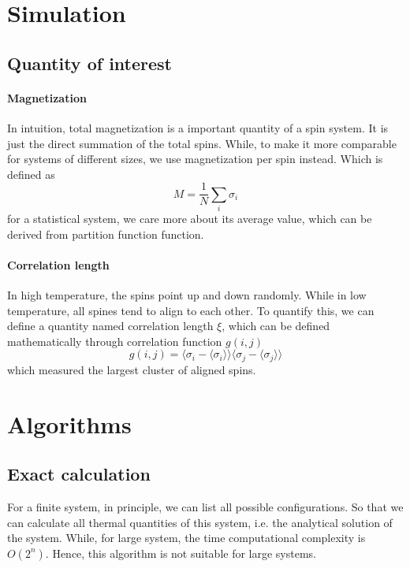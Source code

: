 \documentclass{article}
\begin{document}
\section{Simulation}
\subsection{Quantity of interest}
\paragraph{Magnetization}
In intuition, total magnetization is a important quantity of a spin system. It is just the direct summation of the total spins. While, to make it more comparable for systems of different sizes, we use magnetization per spin instead. Which is defined as
\begin{equation}
M=\frac{1}{N}\sum_i{\sigma_i}
\end{equation}
for a statistical system, we care more about its average value, which can be derived from partition function function. 
\begin{equation}
\end{equation}
\paragraph{Correlation length}
In high temperature, the spins point up and down randomly. While in low temperature, all spines tend to align to each other. To quantify this, we can define a quantity named correlation length $\xi$, which can be defined mathematically through correlation function $g(i,j)$
\begin{equation}
g(i,j)=\langle \sigma_i-\langle\sigma_i\rangle\rangle \langle \sigma_j-\langle\sigma_j\rangle\rangle
\end{equation}
which measured the largest cluster of aligned spins.
\section{Algorithms}
\subsection{Exact calculation}
For a finite system, in principle, we can list all possible configurations. So that we can calculate all thermal quantities of this system, i.e. the analytical solution of the system. While, for large system, the time computational complexity is $O(2^n)$. Hence, this algorithm is not suitable for large systems.
\end{document}
